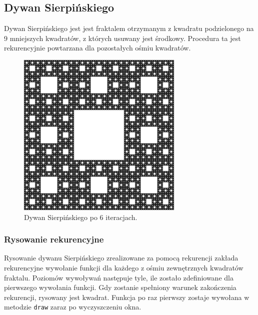 \subsection{Dywan Sierpińskiego}
Dywan Sierpińskiego jest jest fraktalem otrzymanym z kwadratu podzielonego na 9 mniejszych kwadratów, z których usuwany jest środkowy. Procedura ta jest rekurencyjnie powtarzana dla pozostałych ośmiu kwadratów.
\begin{figure}[h]
  \centering
  \includegraphics[width=0.3\linewidth]{img/300px-Sierpinski6.png}
  \caption{Dywan Sierpińskiego po 6 iteracjach.}
\end{figure}

\subsubsection{Rysowanie rekurencyjne}
Rysowanie dywanu Sierpińskiego zrealizowane za pomocą rekurencji zakłada rekurencyjne wywołanie funkcji dla każdego z ośmiu zewnętrznych kwadratów fraktalu. Poziomów wywoływań następuje tyle, ile zostało zdefiniowane dla pierwszego wywołania funkcji. Gdy zostanie spełniony warunek zakończenia rekurencji, rysowany jest kwadrat. Funkcja po raz pierwszy zostaje wywołana w metodzie \lstinline{draw} zaraz po wyczyszczeniu okna.

